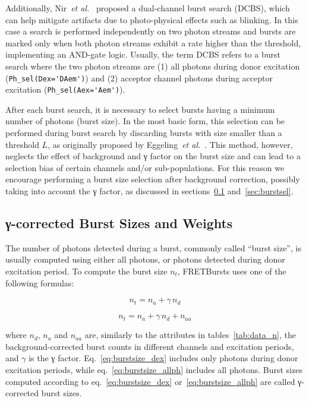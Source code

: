 Additionally, Nir~\textit{et al.}~\cite{Nir_2006} proposed a dual-channel burst
search (DCBS), which can help mitigate artifacts due to
photo-physical effects such as blinking. In this case a search is performed
independently on two photon streams and bursts are marked only when both photon
streams exhibit a rate higher than the threshold,
implementing an AND-gate logic.
Usually, the term DCBS refers to a burst search where the two photon streams
are (1) all photons
during donor excitation (\verb|Ph_sel(Dex='DAem')|) and (2) acceptor channel photons
during acceptor
excitation (\verb|Ph_sel(Aex='Aem')|).

After each burst search, it is necessary to select
bursts having a minimum number of photons (burst size). In the most
basic form, this selection can be performed during burst search by discarding
bursts with size smaller than a threshold $L$, as originally proposed by
Eggeling~\textit{et al.}~\cite{Eggeling_1998}.
This method, however, neglects the effect
of background and γ factor on the burst size and can lead to a selection
bias of certain channels and/or sub-populations.
For this reason we encourage performing a burst size selection after background
correction, possibly taking into account the γ factor, as discussed in
sections~\ref{sec:burstsizeweights} and~\ref{sec:burstsel}.

\subsection{γ-corrected Burst Sizes and Weights}
\label{sec:burstsizeweights}

The number of photons detected during a burst, commonly called ``burst size'',
is usually computed using either all photons, or photons detected 
during donor excitation period. To compute the burst size $n_t$, FRETBursts uses 
one of the following formulas:

\begin{equation}
\label{eq:burstsize_dex}
n_t = n_a + \gamma\,n_d 
\end{equation}

\begin{equation}
\label{eq:burstsize_allph}
n_t = n_a + \gamma\,n_d + n_{aa}
\end{equation}

\noindent where $n_d$, $n_a$ and $n_{aa}$ are, similarly to the attributes 
in tables~\ref{tab:data_n}, the background-corrected
burst counts in different channels and excitation periods,
and $\gamma$ is the γ factor.
Eq.~\ref{eq:burstsize_dex} includes  only photons during donor excitation periods, 
while eq.~\ref{eq:burstsize_allph} includes all photons.
Burst sizes computed according to eq.~\ref{eq:burstsize_dex} 
or~\ref{eq:burstsize_allph} are called γ-corrected burst sizes.

